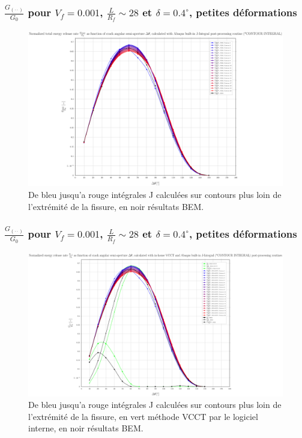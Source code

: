 \documentclass[first,firstsupp,lastsupp,handout,last,hyperref,table]{ETHclass}
\begin{document}
\begin{frame}
\frametitle{\small $\frac{G_{\left(\cdot\cdot\right)}}{G_{0}}$ pour $V_{f}=0.001$, $\frac{L}{R_{f}}\sim28$ et $\delta=0.4^{\circ}$, petites d\'eformations}
\vspace{-0.5cm}
\centering
\captionsetup[figure]{font=scriptsize,labelfont=scriptsize}
\begin{figure}[!h]
\centering
\includegraphics[height=0.7\textheight]{2017-06-23_AbqRunSummary_SingleFiberEqRfSmallStrain_J-INT_Summary.pdf}
  \caption{\scriptsize De bleu jusqu'a rouge int\'egrales J calcul\'ees sur contours plus loin de l'extr\'emit\'e de la fissure, en noir r\'esultats BEM.}
  \label{fig:res1}
\end{figure}
\end{frame}

\begin{frame}
\frametitle{\small $\frac{G_{\left(\cdot\cdot\right)}}{G_{0}}$ pour $V_{f}=0.001$, $\frac{L}{R_{f}}\sim28$ et $\delta=0.4^{\circ}$, petites d\'eformations}
\vspace{-0.5cm}
\centering
\captionsetup[figure]{font=scriptsize,labelfont=scriptsize}
\begin{figure}[!h]
\centering
\includegraphics[height=0.7\textheight]{2017-06-23_AbqRunSummary_SingleFiberEqRfSmallStrain_VCCT-JINT_Summary.pdf}
  \caption{\scriptsize De bleu jusqu'a rouge int\'egrales J calcul\'ees sur contours plus loin de l'extr\'emit\'e de la fissure, en vert m\'ethode VCCT par le logiciel interne, en noir r\'esultats BEM.}
  \label{fig:res1}
\end{figure}
\end{frame}
\end{document}
